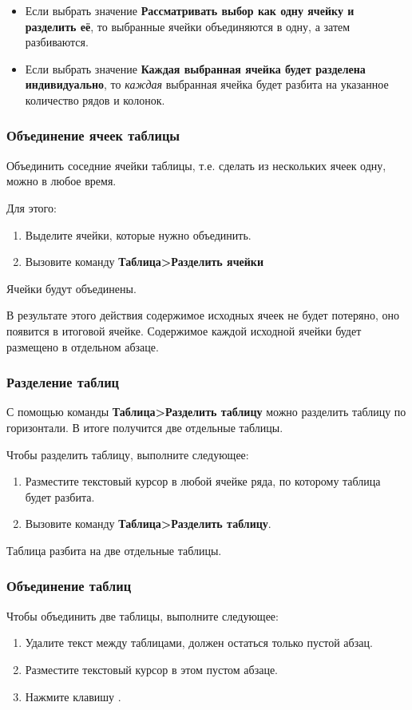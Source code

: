 \documentclass[a4paper,10pt]{article}
\begin{document}
\begin{itemize}
 \item Если выбрать значение \textbf{Рассматривать выбор как одну ячейку и разделить её}, то выбранные ячейки объединяются в одну, а затем разбиваются.
 \item Если выбрать значение \textbf{Каждая выбранная ячейка будет разделена индивидуально}, то \textit{каждая} выбранная ячейка будет разбита на указанное количество рядов и колонок.
\end{itemize}

\subsubsection{Объединение ячеек таблицы}
Объединить соседние ячейки таблицы, т.е. сделать из нескольких ячеек одну, можно в любое время. 

Для этого:

\begin{enumerate}
 \item Выделите ячейки, которые нужно объединить.
 \item Вызовите команду \textbf{Таблица>Разделить ячейки}
\end{enumerate}

Ячейки будут объединены.

В результате этого действия содержимое исходных ячеек не будет потеряно, оно появится в итоговой ячейке. Содержимое каждой исходной ячейки будет размещено в отдельном абзаце.

\subsubsection{Разделение таблиц}
С помощью команды \textbf{Таблица>Разделить таблицу} можно разделить таблицу по горизонтали. В итоге получится две отдельные таблицы.

Чтобы разделить таблицу, выполните следующее:

\begin{enumerate}
 \item Разместите текстовый курсор в любой ячейке ряда, по которому таблица будет разбита.
 \item Вызовите команду \textbf{Таблица>Разделить таблицу}.
\end{enumerate}

Таблица разбита на две отдельные таблицы.

\subsubsection{Объединение таблиц}
Чтобы объединить две таблицы, выполните следующее:
\begin{enumerate}
 \item Удалите текст между таблицами, должен остаться только пустой абзац.
 \item Разместите текстовый курсор в этом пустом абзаце.
 \item Нажмите клавишу .
\end{enumerate}
\end{document}
